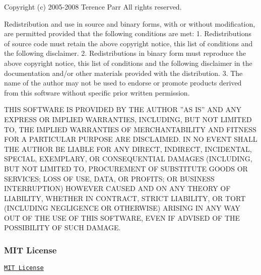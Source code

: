 \begin{DoxyVerb}
Copyright (c) 2005-2008 Terence Parr
All rights reserved.

Redistribution and use in source and binary forms, with or without
modification, are permitted provided that the following conditions
are met:
1. Redistributions of source code must retain the above copyright
   notice, this list of conditions and the following disclaimer.
2. Redistributions in binary form must reproduce the above copyright
   notice, this list of conditions and the following disclaimer in the
   documentation and/or other materials provided with the distribution.
3. The name of the author may not be used to endorse or promote products
   derived from this software without specific prior written permission.

THIS SOFTWARE IS PROVIDED BY THE AUTHOR ''AS IS'' AND ANY EXPRESS OR
IMPLIED WARRANTIES, INCLUDING, BUT NOT LIMITED TO, THE IMPLIED WARRANTIES
OF MERCHANTABILITY AND FITNESS FOR A PARTICULAR PURPOSE ARE DISCLAIMED.
IN NO EVENT SHALL THE AUTHOR BE LIABLE FOR ANY DIRECT, INDIRECT,
INCIDENTAL, SPECIAL, EXEMPLARY, OR CONSEQUENTIAL DAMAGES (INCLUDING, BUT
NOT LIMITED TO, PROCUREMENT OF SUBSTITUTE GOODS OR SERVICES; LOSS OF USE,
DATA, OR PROFITS; OR BUSINESS INTERRUPTION) HOWEVER CAUSED AND ON ANY
THEORY OF LIABILITY, WHETHER IN CONTRACT, STRICT LIABILITY, OR TORT
(INCLUDING NEGLIGENCE OR OTHERWISE) ARISING IN ANY WAY OUT OF THE USE OF
THIS SOFTWARE, EVEN IF ADVISED OF THE POSSIBILITY OF SUCH DAMAGE.\end{DoxyVerb}
\hypertarget{aboutLicensesOSL_licenseOSMIT}{}\subsubsection{M\+I\+T License}\label{aboutLicensesOSL_licenseOSMIT}
\href{https://opensource.org/licenses/MIT}{\tt M\+IT License}

